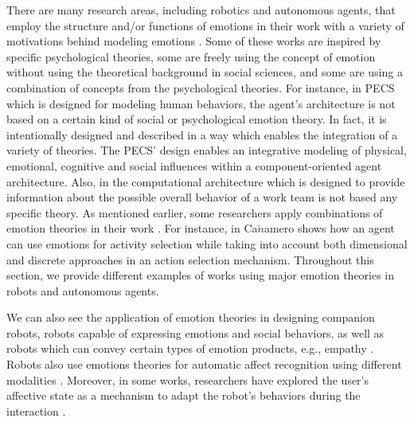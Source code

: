\documentclass[12pt]{report}
\begin{document}
There are many research areas, including robotics and autonomous agents, that
employ the structure and/or functions of emotions in their work with a variety
of motivations behind modeling emotions
\cite{wehrle:motivations-modeling-emotion}. Some of these works are inspired by
specific psychological theories, some are freely using the concept of emotion
without using the theoretical background in social sciences, and some are using
a combination of concepts from the psychological theories. For instance, in PECS
\cite{urban:pecs} which is designed for modeling human behaviors, the agent's
architecture is not based on a certain kind of social or psychological emotion
theory. In fact, it is intentionally designed and described in a way which
enables the integration of a variety of theories. The PECS' design enables an
integrative modeling of physical, emotional, cognitive and social influences
within a component-oriented agent architecture. Also, in
\cite{miranda:teamwork-multiagent-system} the computational architecture which
is designed to provide information about the possible overall behavior of a work
team is not based any specific theory. As mentioned earlier, some researchers
apply combinations of emotion theories in their work
\cite{kiryazov:modeling-appraisal-pad}. For instance, in
\cite{canamero:designing-activity-selection} Ca$\tilde{n}$amero shows how an
agent can use emotions for activity selection while taking into account both
dimensional and discrete approaches in an action selection mechanism. Throughout
this section, we provide different examples of works using major emotion
theories in robots and autonomous agents.

We can also see the application of emotion theories in designing companion
robots, robots capable of expressing emotions and social behaviors, as well
as robots which can convey certain types of emotion products, e.g., empathy
\cite{breazeal:expressive-behavior} \cite{leite:empathy-hri}
\cite{paiva:emotion-modeling} \cite{shayganfar:methodology}. Robots also use
emotions theories for automatic affect recognition using different modalities
\cite{hegel:empathic-robot} \cite{zeng:affect-recognition}. Moreover, in some
works, researchers have explored the user's affective state as a mechanism to
adapt the robot's behaviors during the interaction
\cite{breazeal:sociable-robot} \cite{liu:affect-robot-behavior}.\\
\end{document}
